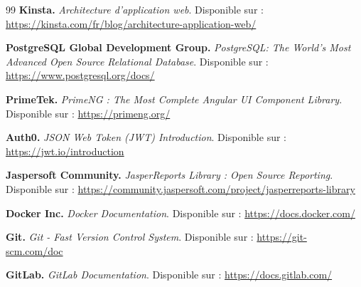\documentclass[12pt, a4paper, openany]{report}
\begin{document}
\begin{large}
\begin{thebibliography}{99}
    \textbf{Kinsta.} \textit{Architecture d'application web}. \newline
    Disponible sur : \url{https://kinsta.com/fr/blog/architecture-application-web/}

    \textbf{PostgreSQL Global Development Group.} \textit{PostgreSQL: The World's Most Advanced Open Source Relational Database}. \newline
    Disponible sur : \url{https://www.postgresql.org/docs/}

    \textbf{PrimeTek.} \textit{PrimeNG : The Most Complete Angular UI Component Library}. \newline
    Disponible sur : \url{https://primeng.org/}

    \textbf{Auth0.} \textit{JSON Web Token (JWT) Introduction}. \newline
    Disponible sur : \url{https://jwt.io/introduction}

    \textbf{Jaspersoft Community.} \textit{JasperReports Library : Open Source Reporting}. \newline
    Disponible sur : \url{https://community.jaspersoft.com/project/jasperreports-library}

    \textbf{Docker Inc.} \textit{Docker Documentation}. \newline
    Disponible sur : \url{https://docs.docker.com/}

    \textbf{Git.} \textit{Git - Fast Version Control System}. \newline
    Disponible sur : \url{https://git-scm.com/doc}

    \textbf{GitLab.} \textit{GitLab Documentation}. \newline
    Disponible sur : \url{https://docs.gitlab.com/}

\end{thebibliography}
\endgroup
\end{large}
\end{document}
